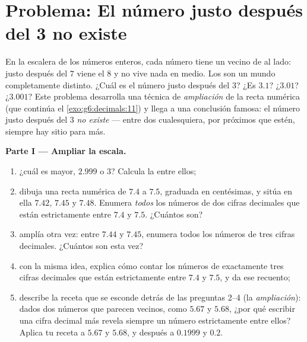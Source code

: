 \section{Problema: El número justo después del 3 no existe}

\begin{problem}
\label{pb:g6:decimals:1}
En la escalera de los números enteros, cada número tiene un vecino de al
lado: justo después del $7$ viene el $8$ y no vive nada en
medio. Los  son un mundo completamente distinto. ¿Cuál es
el número justo después del $3$? ¿Es $3.1$? ¿$3.01$? ¿$3.001$? Este
problema desarrolla una técnica de \emph{ampliación} de la recta numérica
(que continúa el \cref{exo:g6:decimals:11}) y llega a una conclusión
famosa: el número justo después del $3$ \emph{no existe} ---
entre dos  cualesquiera, por próximos que estén, siempre hay
sitio para más.

\medskip
\noindent\textbf{Parte I --- Ampliar la escala.}
\begin{enumerate}
  \item ¿cuál es mayor, $2.999$ o $3$? Calcula la 
        entre ellos;
  \item dibuja una recta numérica de $7.4$ a $7.5$, graduada en
        centésimas, y sitúa en ella $7.42$, $7.45$ y $7.48$.
        Enumera \emph{todos} los números de dos cifras decimales que
        están estrictamente entre $7.4$ y $7.5$. ¿Cuántos son?
  \item amplía otra vez: entre $7.44$ y $7.45$, enumera todos los
        números de tres cifras decimales. ¿Cuántos son
        esta vez?
  \item con la misma idea, explica cómo contar los números
        de exactamente tres cifras decimales que están estrictamente entre
        $7.4$ y $7.5$, y da ese recuento;
  \item describe la receta que se esconde detrás de las preguntas 2--4 (la
        \emph{ampliación}): dados dos números que parecen
        vecinos, como $5.67$ y $5.68$, ¿por qué escribir
        una cifra decimal más revela siempre un número estrictamente
        entre ellos? Aplica tu receta a $5.67$ y $5.68$,
        y después a $0.1999$ y $0.2$.
\end{enumerate}


\end{problem}
